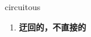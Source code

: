 
\begin{frame}
{\huge circuitous}
\begin{center}
\begin{enumerate}\Large
  \item \textbf{迂回的，不直接的}
\end{enumerate}
\end{center}
\end{frame}
